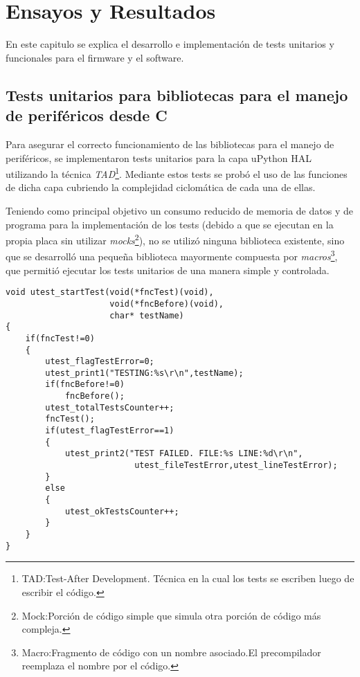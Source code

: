 
\chapter{Ensayos y Resultados} %
En este capitulo se explica el desarrollo e implementación de tests unitarios y funcionales para el firmware y el software.

\label{Chapter4} %


\section{Tests unitarios para bibliotecas para el manejo de periféricos desde C}
\label{sec:testUnitariosC}

Para asegurar el correcto funcionamiento de las bibliotecas para el manejo de periféricos, se implementaron tests unitarios para la capa uPython HAL utilizando la técnica \textit{TAD}\footnote{TAD:Test-After Development. Técnica en la cual los tests se escriben luego de escribir el código.}. Mediante estos tests se probó el uso de las funciones de dicha capa cubriendo la complejidad ciclomática de cada una de ellas.

Teniendo como principal objetivo un consumo reducido de memoria de datos y de programa para la implementación de los tests (debido a que se ejecutan en la propia placa sin utilizar \textit{mocks}\footnote{Mock:Porción de código simple que simula otra porción de código más compleja.}), no se utilizó ninguna biblioteca existente, sino que se desarrolló una pequeña biblioteca mayormente compuesta por \textit{macros}\footnote{Macro:Fragmento de código con un nombre asociado.El precompilador reemplaza el nombre por el código.}, que permitió ejecutar los tests unitarios de una manera simple y controlada.


\begin{lstlisting}[label={lst:utest},caption=Función que ejecuta un test unitario incluida en el archivo utest.c del firmware.]
void utest_startTest(void(*fncTest)(void),
                     void(*fncBefore)(void),
                     char* testName)
{
	if(fncTest!=0)
	{
		utest_flagTestError=0;
		utest_print1("TESTING:%s\r\n",testName);
		if(fncBefore!=0)
			fncBefore();
		utest_totalTestsCounter++;
		fncTest();
		if(utest_flagTestError==1)
		{
			utest_print2("TEST FAILED. FILE:%s LINE:%d\r\n",
			              utest_fileTestError,utest_lineTestError);
		}
		else
		{
			utest_okTestsCounter++;
		}
	}
} 
\end{lstlisting}

